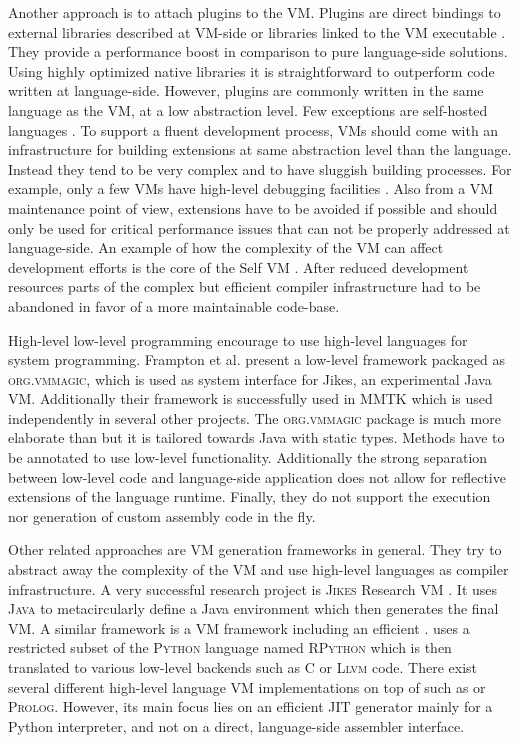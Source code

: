 Another approach is to attach plugins to the VM.
Plugins are direct bindings to external libraries described at VM-side or libraries linked to the VM executable \cite[Ch.\ 5]{Blac09a}. 
They provide a performance boost in comparison to pure language-side solutions.
Using highly optimized native libraries it is straightforward to outperform code written at language-side.
However, plugins are commonly written in the same language as the VM, at a low abstraction level.
Few exceptions are self-hosted languages \cite{Unga05a,Wimm13a,Rigo06a}.
To support a fluent development process, VMs should come with an infrastructure for building extensions at same abstraction level than the language.
Instead they tend to be very complex and to have sluggish building processes. For example, only a few VMs have high-level debugging facilities \cite{Inga97a,Unga05a,Wimm13a}.
Also from a VM maintenance point of view, extensions have to be avoided if possible and should only be used for critical performance issues that can not be properly addressed at language-side.
An example of how the complexity of the VM can affect development efforts is the core of the Self VM \cite{Unga07a}.
After reduced development resources parts of the complex but efficient compiler infrastructure had to be abandoned in favor of a more maintainable code-base.

High-level low-level programming \cite{Fram09a} encourage to use high-level languages for system programming.
Frampton et al. present a low-level framework packaged as \textsc{org.vmmagic}, which is used as system interface for Jikes, an experimental Java VM.
Additionally their framework is successfully used in MMTK \cite{Blac04a} which is used independently in several other projects.
The \textsc{org.vmmagic} package is much more elaborate than \B but it is tailored towards Java with static types.
Methods have to be annotated to use low-level functionality.
Additionally the strong separation between low-level code and language-side application does not allow for reflective extensions of the language runtime.
Finally, they do not support the execution nor generation of custom assembly code in the fly.

Other related approaches are VM generation frameworks in general.
They try to abstract away the complexity of the VM and use high-level languages as compiler infrastructure.
A very successful research project is \textsc{Jikes} Research VM \cite{Jikes}.
It uses \textsc{Java} to metacircularly define a Java environment which then generates the final VM.
A similar framework is \PyPy \cite{Rigo06a} a VM framework including an efficient \JIT. 
\PyPy uses a restricted subset of the  \textsc{Python} language named \textsc{RPython} which is then translated to various low-level backends such as C or \textsc{Llvm} code.
There exist several different high-level language VM implementations on top of \PyPy such as \ST \cite{Bolz08a} or \textsc{Prolog}.
However, its main focus lies on an efficient JIT generator mainly for a Python interpreter, and not on a direct, language-side assembler interface.



